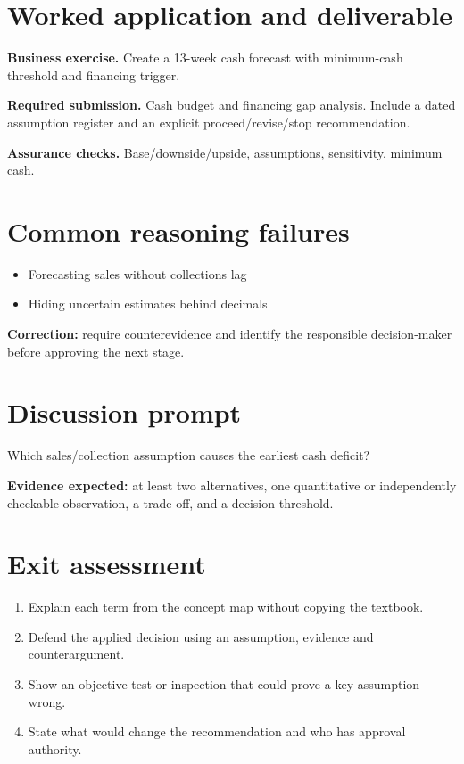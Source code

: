 \documentclass[11pt,letterpaper]{article}
\begin{document}
\section{Worked application and deliverable}
\textbf{Business exercise.} Create a 13-week cash forecast with minimum-cash threshold and financing trigger.\par\textbf{Required submission.} Cash budget and financing gap analysis. Include a dated assumption register and an explicit proceed/revise/stop recommendation.\par\textbf{Assurance checks.} Base/downside/upside, assumptions, sensitivity, minimum cash.
\section{Common reasoning failures}
\begin{itemize}[leftmargin=*,itemsep=3pt]
\item Forecasting sales without collections lag
\item Hiding uncertain estimates behind decimals
\end{itemize}
\noindent\textbf{Correction:} require counterevidence and identify the responsible decision-maker before approving the next stage.
\section{Discussion prompt}
Which sales/collection assumption causes the earliest cash deficit?\par\medskip\textbf{Evidence expected:} at least two alternatives, one quantitative or independently checkable observation, a trade-off, and a decision threshold.
\section{Exit assessment}
\begin{enumerate}[leftmargin=*,itemsep=5pt]
\item Explain each term from the concept map without copying the textbook.
\item Defend the applied decision using an assumption, evidence and counterargument.
\item Show an objective test or inspection that could prove a key assumption wrong.
\item State what would change the recommendation and who has approval authority.
\end{enumerate}

\end{document}
